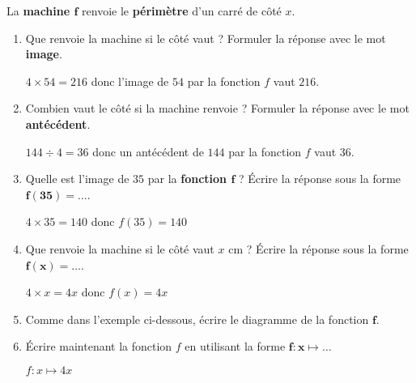 \begin{corrige}
    La \textbf{machine $\boldsymbol{f}$} renvoie le \textbf{périmètre} d'un carré de côté $x$.
    
    \hspace*{-13mm}

    
  \begin{enumerate}
    \item Que renvoie la machine si le côté vaut   ? Formuler la réponse avec le mot \textbf{image}.
    
    {\red $4\times 54 = 216$ donc l'image de $54$ par la fonction $f$ vaut $216$.}
    \item Combien vaut le côté si la machine renvoie   ? Formuler la réponse avec le mot \textbf{antécédent}.
    
    {\red $144\div 4 = 36$ donc un antécédent de $144$ par la fonction $f$ vaut $36$.}
    \item Quelle est l'image de $35$ par la \textbf{fonction $\boldsymbol{f}$ } ? Écrire la réponse sous la forme $\boldsymbol{f(35)=\ldots}$.
    
    {\red $4\times 35 = 140$ donc $f(35)=140$}
    \item Que renvoie la machine si le côté vaut $x$ cm ? Écrire la réponse sous la forme $\boldsymbol{f(x)=\ldots}$.
    
    {\red $4\times x = 4x$ donc $f(x)=4x$}
    \end{enumerate}
    \Coupe  
    \begin{enumerate}
    \setcounter{enumi}{4}
    \item Comme dans l'exemple ci-dessous, écrire le diagramme de la fonction $\boldsymbol{f}$.

    \medskip
    \item Écrire maintenant la fonction $f$ en utilisant la forme $\boldsymbol{f:x} \longmapsto \ldots$
    
    {\red $f:x \longmapsto 4x$}
\end{enumerate}
\vspace*{-3mm}
\end{corrige}
